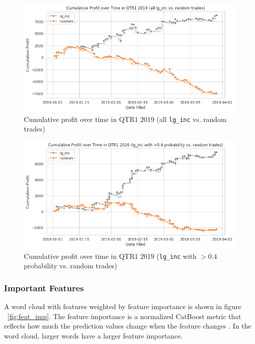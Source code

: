 \documentclass{article}
\begin{document}
	\begin{figure}[h!]
		\includegraphics[width=\linewidth]{img/trade_lg_inc_all.png}
		\caption{Cumulative profit over time in QTR1 2019 (all \lstinline{lg_inc} vs. random trades)}
		\label{fig:trade_lg_inc_all}
	\end{figure}


	\begin{figure}[h!]
		\includegraphics[width=\linewidth]{img/trade_lg_inc_40.png}
		\caption{Cumulative profit over time in QTR1 2019 (\lstinline{lg_inc} with $>0.4$ probability vs. random trades)}
		\label{fig:trade_lg_inc_0.4}
	\end{figure}

	\newpage
	\subsubsection{Important Features}
	
	A word cloud with features weighted by feature importance is shown in figure ~\ref{fig:feat_imp}. The feature importance is a normalized CatBoost metric that reflects how much the prediction values change when the feature changes \cite{noauthor_feature_nodate}. In the word cloud, larger words have a larger feature importance.
	
\end{document}
